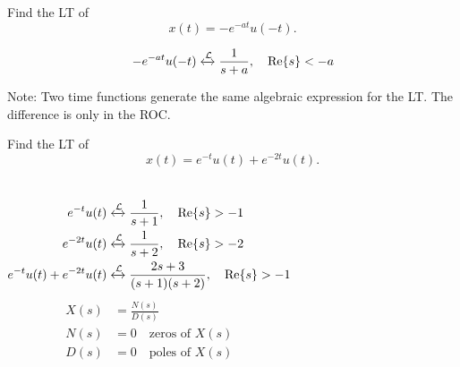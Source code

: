 \begin{frame}[t,allowframebreaks]{}
    \begin{example}
        Find the LT of
        \begin{equation*}
            x(t) = -e^{-at}u(-t).
        \end{equation*}
    \end{example}

    {
        \begin{solution}
            \begin{equation*}
                -e^{-at}u(-t) \xleftrightarrow{\mathcal{L}}   \frac{1}{s+a}, \quad \mathrm{Re}\{s\} < -a
            \end{equation*}
        \end{solution}
        Note: Two time functions generate the same algebraic expression for the LT. The difference is only in the ROC.
    }

\end{frame}

\begin{frame}[t]{}
    \begin{example}
        Find the LT of
        \begin{equation*}
            x(t) = e^{-t}u(t)+ e^{-2t}u(t).
        \end{equation*}
    \end{example}

    {
    

        \begin{solution}\end{solution}
            \begin{columns}[t]
                    \begin{align*}
                        e^{-t}u(t) &\xleftrightarrow{\mathcal{L}}   \frac{1}{s+1}, \quad \mathrm{Re}\{s\} > -1\\
                        e^{-2t}u(t) &\xleftrightarrow{\mathcal{L}}   \frac{1}{s+2}, \quad \mathrm{Re}\{s\} > -2\\
                        e^{-t}u(t)+ e^{-2t}u(t) &\xleftrightarrow{\mathcal{L}}   \frac{2s+3}{(s+1)(s+2)}, \quad \mathrm{Re}\{s\} > -1
                    \end{align*}
                    \begin{align*}
                        X(s) &= \frac{N(s)}{D(s)}\\
                        N(s) &= 0\quad \text{zeros of } X(s)\\
                        D(s) &= 0\quad \text{poles of } X(s)
                    \end{align*}

                    
            \end{columns}
    }
\end{frame}


